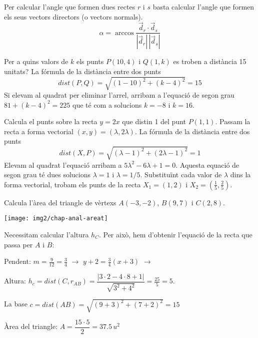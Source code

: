 \documentclass[11pt, a4paper, pdf]{article}
\begin{document}
\begin{theorybox}
	Per calcular l'angle que formen dues rectes $r$ i $s$ basta calcular l'angle que formen els seus vectors directors (o vectors normals). 
	\begin{equation*}
	\alpha = \arccos \dfrac{\vec d_r \cdot \vec d_s}{|\vec d_r|\, |\vec d_s|}
	\end{equation*}
\end{theorybox}

\begin{resolt}[E]{Per a quins valors de $k$ els punts $P(10,4)$ i $Q(1,k)$ es troben a distància 15 unitats?}
	La fórmula de la distància entre dos punts
	\begin{equation*}
	dist(P,Q)=\sqrt{(1-10)^2+(k-4)^2}=15
	\end{equation*}
	Si elevam al quadrat per eliminar l'arrel, arribam a l'equació de segon grau $81+(k-4)^2=225$ que té com a solucions $k=-8$ i $k=16$.
\end{resolt}
\vspace{-0.65cm}
\begin{resolt}{Calcula el punts sobre la recta $y=2x$ que distin 1 del punt $P(1,1)$.}
	Passam la recta a forma vectorial $(x,y)=(\lambda, 2\lambda)$. La fórmula de la distància entre dos punts
	\begin{equation*}
	dist(X,P)=\sqrt{(\lambda-1)^2+(2\lambda-1)^2}=1
	\end{equation*}
	Elevam al quadrat l'equació arribam a $5\lambda^2-6\lambda+1=0$. Aquesta equació de segon grau té dues solucions $\lambda=1$ i $\lambda=1/5$. Substituïnt cada valor de $\lambda$ dins la forma vectorial, trobam els punts de la recta $X_1=(1,2)$ i $X_2=(\frac{1}{5}, \frac{2}{5})$.
\end{resolt}
\vspace{-0.65cm}
\begin{resolt}{Calcula l'àrea del triangle de vèrtexs $A(-3,-2)$, $B(9, 7)$ i $C(2,8)$.
		
		\texttt{[image: img2/chap-anal-areat]}
	}
	Necessitam calcular l'altura $h_C$. Per això, hem d'obtenir l'equació de la recta que passa per $A$ i $B$:\vspace{0.25cm}
	
	Pendent: $m=\frac{9}{12}=\frac{3}{4}$ $\rightarrow$ $y+2=\frac{3}{4}(x+3)$ $\rightarrow$ \vspace{0.25cm}
	
	Altura: $h_c=dist(C, r_{AB})=\dfrac{|3\cdot 2-4\cdot 8+1|}{\sqrt{3^2+4^2}}=\frac{25}{5}=5$.\vspace{0.25cm}
	
	La base $c=dist(AB)=\sqrt{(9+3)^2+(7+2)^2}=15$\vspace{0.25cm}
	
	Àrea del triangle: $A=\dfrac{15\cdot 5}{2}=37.5\, u^2$
\end{resolt}
\end{document}
